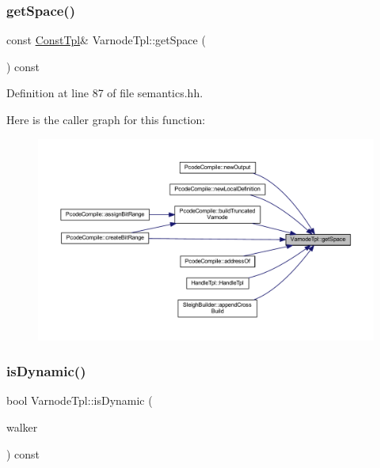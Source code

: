 \subsubsection{\texorpdfstring{getSpace()}{getSpace()}}
{\footnotesize\ttfamily const \mbox{\hyperlink{class_const_tpl}{Const\+Tpl}}\& Varnode\+Tpl\+::get\+Space (\begin{DoxyParamCaption}\item[{void}]{ }\end{DoxyParamCaption}) const\hspace{0.3cm}{\ttfamily [inline]}}



Definition at line 87 of file semantics.\+hh.

Here is the caller graph for this function\+:
\nopagebreak
\begin{figure}[H]
\begin{center}
\leavevmode
\includegraphics[width=350pt]{class_varnode_tpl_a8e64fde8b1b76550d7bec9ad48cce669_icgraph}
\end{center}
\end{figure}
\mbox{\label{class_varnode_tpl_a2a8ab3751ee12b01f405e377911b3098}} 
\subsubsection{\texorpdfstring{isDynamic()}{isDynamic()}}
{\footnotesize\ttfamily bool Varnode\+Tpl\+::is\+Dynamic (\begin{DoxyParamCaption}\item[{const \mbox{\hyperlink{class_parser_walker}{Parser\+Walker}} \&}]{walker }\end{DoxyParamCaption}) const}



